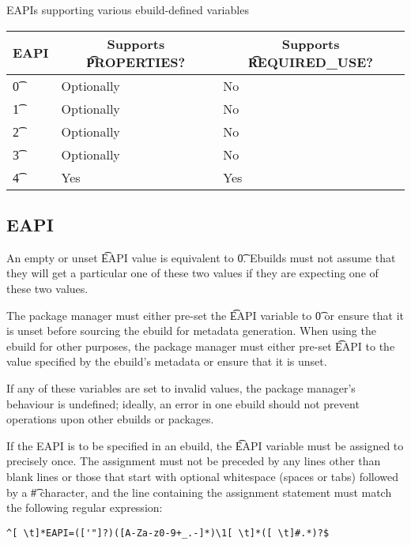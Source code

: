 \begin{centertable}{EAPIs supporting various ebuild-defined variables}
\label{tab:optional-vars-table}
    \begin{tabular}{ l l l }
        \toprule
        \multicolumn{1}{c}{\textbf{EAPI}} &
        \multicolumn{1}{c}{\textbf{Supports \t{PROPERTIES}?}} &
        \multicolumn{1}{c}{\textbf{Supports \t{REQUIRED\_USE}?}} \\
        \midrule
    \t{0} & Optionally & No \\
    \t{1} & Optionally & No \\
    \t{2} & Optionally & No \\
    \t{3} & Optionally & No \\
    \t{4} & Yes & Yes \\
    \bottomrule
    \end{tabular}
\end{centertable}

\subsection{EAPI}
\label{sec:pre-source-eapi}

An empty or unset \t{EAPI} value is equivalent to \t{0}. Ebuilds must not assume that they will get
a particular one of these two values if they are expecting one of these two values.

The package manager must either pre-set the \t{EAPI} variable to \t{0} or ensure that it is unset
before sourcing the ebuild for metadata generation. When using the ebuild for other purposes, the
package manager must either pre-set \t{EAPI} to the value specified by the ebuild's metadata or
ensure that it is unset.

If any of these variables are set to invalid values, the package manager's behaviour is undefined;
ideally, an error in one ebuild should not prevent operations upon other ebuilds or packages.

If the EAPI is to be specified in an ebuild, the \t{EAPI} variable must be assigned to precisely
once. The assignment must not be preceded by any lines other than blank lines or those that start
with optional whitespace (spaces or tabs) followed by a \t{\#} character, and the line containing
the assignment statement must match the following regular expression:
\begin{verbatim}
^[ \t]*EAPI=(['"]?)([A-Za-z0-9+_.-]*)\1[ \t]*([ \t]#.*)?$
\end{verbatim}

